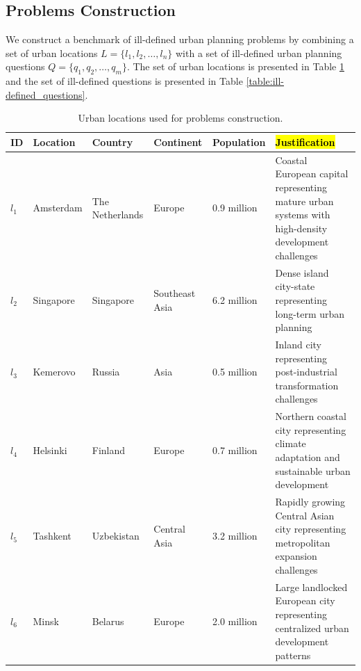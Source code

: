 \subsection{Problems Construction}

We construct a benchmark of ill-defined urban planning problems by combining a set of urban locations $L=\{l_1,l_2,\dots,l_n\}$ with a set of ill-defined urban planning questions $Q=\{q_1,q_2,\dots,q_m\}$.
The set of urban locations is presented in Table \ref{table:urban_locations} and the set of ill-defined questions is presented in Table \ref{table:ill-defined_questions}.

\begin{table}[h]
\centering
\small
\begin{tabularx}{\textwidth}{l|llllX}
\hline
\textbf{ID} & \textbf{Location}  & \textbf{Country} & \textbf{Continent} & \textbf{Population} & \hl{\textbf{Justification}} \\
\hline
$l_1$ & Amsterdam  &  The Netherlands & Europe & 0.9 million & Coastal European capital representing mature urban systems with high-density development challenges\\
\midrule
$l_2$ & Singapore  &  Singapore & Southeast Asia & 6.2 million & Dense island city-state representing long-term urban planning\\
\midrule
$l_3$ & Kemerovo  &  Russia & Asia & 0.5 million & Inland city representing post-industrial transformation challenges\\
\midrule
$l_4$ & Helsinki  &  Finland & Europe & 0.7 million & Northern coastal city representing climate adaptation and sustainable urban development\\
\midrule
$l_5$ & Tashkent  &  Uzbekistan & Central Asia & 3.2 million & Rapidly growing Central Asian city representing metropolitan expansion challenges\\
\midrule
$l_6$ & Minsk  &  Belarus & Europe & 2.0 million & Large landlocked European city representing centralized urban development patterns\\
\hline
\end{tabularx}
\caption{Urban locations used for problems construction.}
\label{table:urban_locations}
\end{table}

